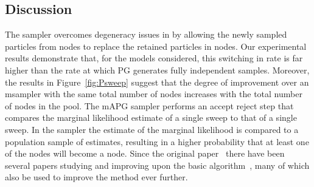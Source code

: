 
\subsection{Discussion}
\label{sec:discussion}

The \ipmcmc sampler overcomes degeneracy issues in \pg by allowing the newly sampled particles from \smc nodes to replace the retained particles in \csmc nodes. Our experimental results demonstrate that, for the models considered, this switching in rate is far higher than the rate at which PG generates fully independent samples. Moreover, the results in Figure~\ref{fig:Psweep} suggest that the degree of improvement over an m\pg sampler with the same total number of nodes increases with the total number of nodes in the pool. 
The mAPG sampler performs an accept reject step that compares the marginal likelihood estimate of a single \csmc sweep to that of a single \smc sweep. In the \ipmcmc sampler the \csmc estimate of the marginal likelihood is compared to a population sample of \smc estimates, resulting in a higher probability that at least one of the \smc nodes will become a \csmc node.
Since the original \pmcmc paper~\citep{andrieu2009pseudo} there have been several papers studying %
and improving upon the basic \pg
 algorithm~\citep{chopin2015,lindsten2015uniform,whiteley2010efficient,lindsten2013backward,lindstenJS2014},
 many of which also be used to improve the \ipmcmc method ever further.  





